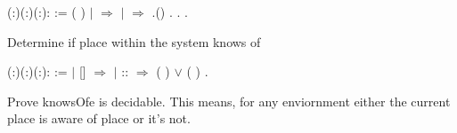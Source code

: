 \documentclass[12pt]{report}
\begin{document}
\begin{coqdoccode}
\coqdocemptyline
\coqdocnoindent
{} (:)(:)(:): :=\coqdoceol
\coqdocnoindent
{} ( ) \coqdoceol
\coqdocnoindent
\ensuremath{|}  \ensuremath{\Rightarrow} \coqdoceol
\coqdocnoindent
\ensuremath{|}   \ensuremath{\Rightarrow}   .()\coqdoceol
\coqdocnoindent
{}.\coqdoceol
\coqdocemptyline
\coqdocnoindent
{} .\coqdoceol
\coqdocnoindent
{} .\coqdoceol
\coqdocemptyline
\end{coqdoccode}
Determine if place  within the system  knows of  
\begin{coqdoccode}
\coqdocemptyline
\coqdocnoindent
{} (:)(:)(:): :=\coqdoceol
\coqdocnoindent
{}  \coqdoceol
\coqdocnoindent
\ensuremath{|} [] \ensuremath{\Rightarrow} \coqdoceol
\coqdocnoindent
\ensuremath{|}  ::  \ensuremath{\Rightarrow} (   ) \ensuremath{\lor} (   )\coqdoceol
\coqdocnoindent
{}.\coqdoceol
\coqdocemptyline
\end{coqdoccode}
Prove knowsOfe is decidable. This means, for any enviornment  
   either the current place  is aware of place  or it's not.  
\end{document}
